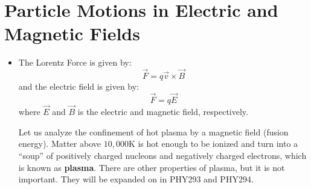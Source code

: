 \section{Particle Motions in Electric and Magnetic Fields}
\begin{itemize}
    \item The Lorentz Force is given by:
    \begin{equation}
        \vec{F} = q\vec{v} \times \vec{B}
    \end{equation}
    and the electric field is given by:
    \begin{equation}
        \vec{F} = q\vec{E}
    \end{equation}
    where $\vec{E}$ and $\vec{B}$ is the electric and magnetic field, respectively.
    \begin{example}
        Let us analyze the confinement of hot plasma by a magnetic field (fusion energy). Matter above $10,000\si{\kelvin}$ is hot enough to be ionized and turn into a ``soup'' of positively charged nucleons and negatively charged electrons, which is known as \textbf{plasma}. There are other properties of plasma, but it is not important. They will be expanded on in PHY293 and PHY294.
        \vspace{2mm}


\end{example}
\end{itemize}
